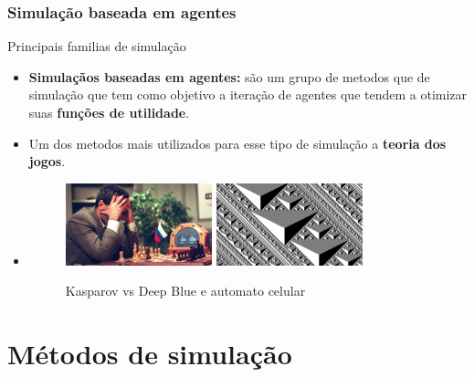 \documentclass{beamer}
\begin{document}
	\subsubsection{Simulação baseada em agentes}
	\begin{frame}{Principais familias de simulação}
		\begin{itemize}[<+->]
			\item \textbf{Simulaçãos baseadas em agentes:} são um grupo de metodos que de simulação que tem como objetivo a iteração de agentes que tendem a otimizar suas \textbf{funções de utilidade}. \cite{dooley_simulation_2002}
			\item Um dos metodos mais utilizados para esse tipo de simulação a \textbf{teoria dos jogos}.
			\item 
			\begin{figure}[!v]
				\centering
				\includegraphics[width=0.4\textwidth]{kasparov}
				\includegraphics[width=0.4\textwidth]{CA}
				\caption{Kasparov vs Deep Blue e automato celular}
			\end{figure}
		\end{itemize}
	\end{frame}
	\section{Métodos de simulação}
\end{document}
